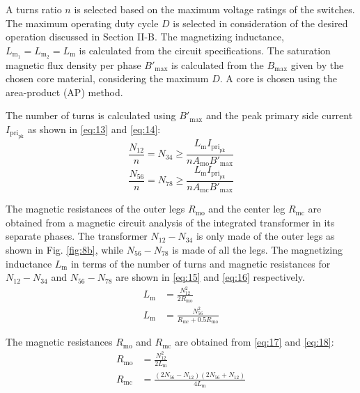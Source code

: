 \documentclass[lettersize,journal]{IEEEtran}
\begin{document}
A turns ratio $n$ is selected based on the maximum voltage ratings of the switches. The maximum operating duty cycle $D$ is selected in consideration of the desired operation discussed in Section II-B. The magnetizing inductance, $L_{\mathrm{m}_1}=L_{\mathrm{m}_2}=L_{\mathrm{m}}$ is calculated from the circuit specifications. The saturation magnetic flux density per phase $B'_{\mathrm{max}}$ is calculated from the $B_{\mathrm{max}}$ given by the chosen core material, considering the maximum $D$. A core is chosen using the area-product (AP) method. 

The number of turns is calculated using $B'_{\mathrm{max}}$ and the peak primary side current $I_{\mathrm{pri}_{\mathrm{pk}}}$ as shown in \eqref{eq:13} and \eqref{eq:14}:
\begin{equation}
\label{eq:13}
\frac{N_{12}}{n} = N_{34} \ge \frac{L_{\mathrm{m}} I_{\mathrm{pri}_{\mathrm{pk}}}}{n A_{\mathrm{mo}} B'_{\mathrm{max}}}
\end{equation}
\begin{equation}
\label{eq:14}
\frac{N_{56}}{n} = N_{78} \ge \frac{L_{\mathrm{m}} I_{\mathrm{pri}_{\mathrm{pk}}}}{n A_{\mathrm{mc}} B'_{\mathrm{max}}}
\end{equation}

The magnetic resistances of the outer legs $R_{\mathrm{mo}}$ and the center leg $R_{\mathrm{mc}}$ are obtained from a magnetic circuit analysis of the integrated transformer in its separate phases. The transformer $N_{12}-N_{34}$ is only made of the outer legs as shown in Fig. \ref{fig:8b}, while $N_{56}-N_{78}$ is made of all the legs. The magnetizing inductance $L_{\mathrm{m}}$ in terms of the number of turns and magnetic resistances for $N_{12}-N_{34}$ and $N_{56}-N_{78}$ are shown in \eqref{eq:15} and \eqref{eq:16} respectively.
\begin{align}
L_{\mathrm{m}} &= \frac{N_{12}^2}{2 R_{\mathrm{mo}}} \label{eq:15}\\
L_{\mathrm{m}} &= \frac{N_{56}^2}{R_{\mathrm{mc}} + 0.5 R_{\mathrm{mo}}} \label{eq:16}
\end{align}

The magnetic resistances $R_{\mathrm{mo}}$ and $R_{\mathrm{mc}}$ are obtained from \eqref{eq:17} and \eqref{eq:18}:
\begin{align}
R_{\mathrm{mo}} &= \frac{N_{12}^2}{2 L_{\mathrm{m}}} \label{eq:17}\\
R_{\mathrm{mc}} &= \frac{(2 N_{56} - N_{12})(2 N_{56} + N_{12})}{4 L_{\mathrm{m}}} \label{eq:18}
\end{align}
\end{document}
